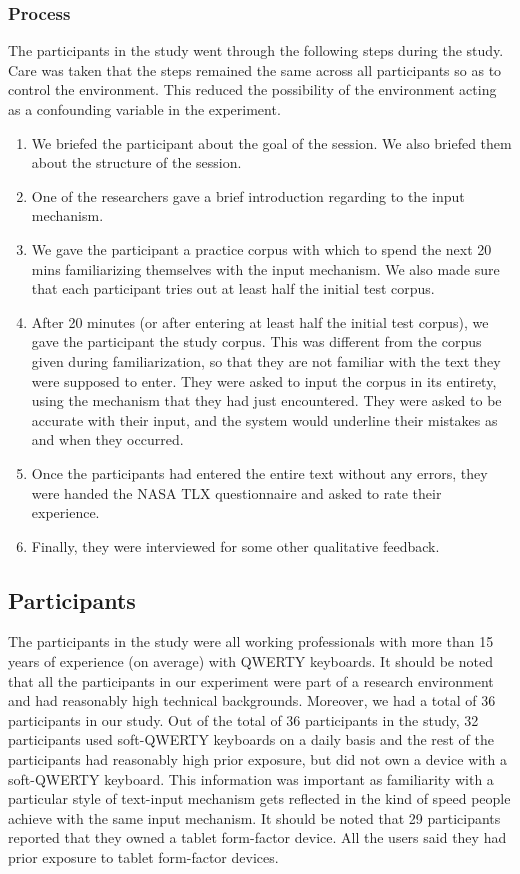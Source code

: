 \subsubsection{Process}

The participants in the study went through the following steps during
the study. Care was taken that the steps remained the same across all
participants so as to control the environment. This reduced the
possibility of the environment acting as a confounding variable in the
experiment. 

\begin{enumerate}
\item We briefed the participant about the goal of the session. We also
  briefed them about the structure of the session.
\item One of the researchers gave a brief introduction regarding to
  the input mechanism. 
\item We gave the participant a practice corpus with which to spend the next 20 mins familiarizing themselves with the input mechanism. We also made sure that each participant tries out at least half the initial test corpus. 
\item After 20 minutes (or after entering at least half the initial test corpus), we gave the participant the study corpus. This was different from the corpus given during familiarization, so that they are not familiar with the text they were supposed to enter. They were asked to input the corpus in its entirety, using the mechanism that they had just encountered. They were asked to be accurate with their input, and the system would underline their mistakes as and when they occurred.
\item Once the participants had entered the entire text without any
  errors, they were handed the NASA TLX questionnaire and asked to
  rate their experience.
\item Finally, they were interviewed for some other qualitative feedback.
\end{enumerate}

\subsection{Participants}
The participants in the study were all working professionals with more than 15 years of experience (on average) with QWERTY keyboards. It should be noted that all the participants in our experiment were part of a research environment and had reasonably high technical backgrounds. Moreover, we had a total of 36 participants in our study. Out of the total of 36 participants in the study, 32 participants used soft-QWERTY keyboards on a daily basis and the rest of the participants had reasonably high prior exposure, but did not own a device with a soft-QWERTY keyboard. This information was important as familiarity with a particular style of text-input mechanism gets reflected in the kind of speed people achieve with the same input mechanism. It should be noted that 29 participants reported that they owned a tablet form-factor device. All the users said they had prior exposure to tablet form-factor devices. 
	